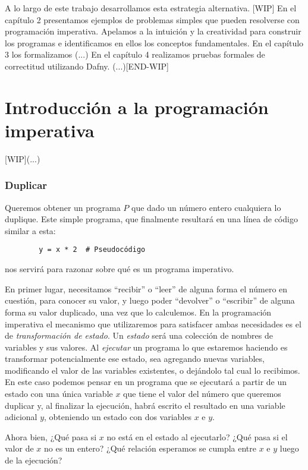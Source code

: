 \documentclass[11pt, a4paper, openany]{book}
\begin{document}
    A lo largo de este trabajo desarrollamos esta estrategia alternativa.
    [WIP]
    En el capítulo 2 presentamos ejemplos de problemas simples que pueden resolverse con programación imperativa. Apelamos a la intuición y la creatividad para construir los programas e identificamos en ellos los conceptos fundamentales.
    En el capítulo 3 los formalizamos (...)
    En el capítulo 4 realizamos pruebas formales de correctitud utilizando Dafny. (...)[END-WIP]

    \chapter{Introducción a la programación imperativa}
    [WIP](...)

    \subsection{Duplicar}
    Queremos obtener un programa $P$ que dado un número entero cualquiera lo duplique. Este simple programa, que finalmente resultará en una línea de código similar a esta:
    \begin{verbatim}
        y = x * 2  # Pseudocódigo
    \end{verbatim}
    nos servirá para razonar sobre qué es un programa imperativo.


    En primer lugar, necesitamos ``recibir'' o ``leer'' de alguna forma el número en cuestión, para conocer su valor, y luego poder ``devolver'' o ``escribir'' de alguna forma su valor duplicado, una vez que lo calculemos.
    En la programación imperativa el mecanismo que utilizaremos para satisfacer ambas necesidades es el de \textit{transformación de estado}.
    Un \textit{estado} será una colección de nombres de variables y sus valores. Al \textit{ejecutar} un programa lo que estaremos haciendo es transformar potencialmente ese estado, sea agregando nuevas variables, modificando el valor de las variables existentes, o dejándolo tal cual lo recibimos.
    En este caso podemos pensar en un programa que se ejecutará a partir de un estado con una única variable $x$ que tiene el valor del número que queremos duplicar y, al finalizar la ejecución, habrá escrito el resultado en una variable adicional $y$, obteniendo un estado con dos variables $x$ e $y$.

    Ahora bien,
    ¿Qué pasa si $x$ no está en el estado al ejecutarlo?
    ¿Qué pasa si el valor de $x$ no es un entero?
    ¿Qué relación esperamos se cumpla entre $x$ e $y$ luego de la ejecución?
\end{document}
